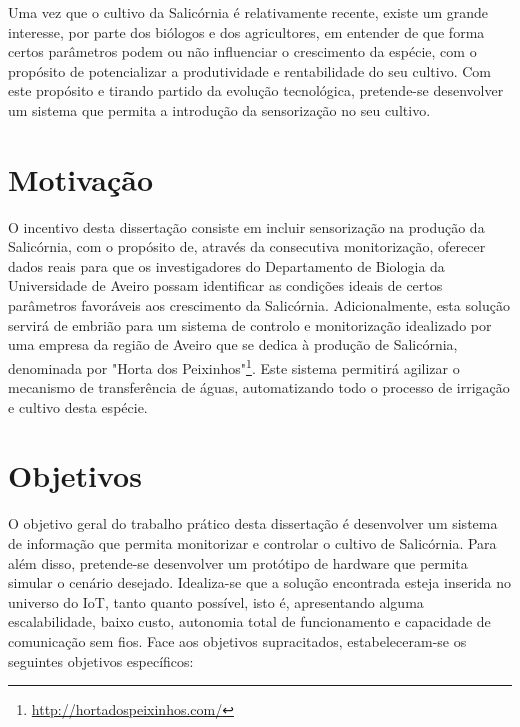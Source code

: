 Uma vez que o cultivo da Salicórnia é relativamente recente, existe um grande interesse, por parte dos biólogos e dos agricultores, em entender de que forma certos parâmetros podem ou não influenciar o crescimento da espécie, com o propósito de potencializar a produtividade e rentabilidade do seu cultivo. Com este propósito e tirando partido da evolução tecnológica, pretende-se desenvolver um sistema que permita a introdução da sensorização no seu cultivo.     


\section{Motivação}

O incentivo desta dissertação consiste em incluir sensorização na produção da Salicórnia, com o propósito de, através da consecutiva monitorização, oferecer dados reais para que os investigadores do Departamento de Biologia da Universidade de Aveiro possam identificar as condições ideais de certos parâmetros favoráveis aos crescimento da Salicórnia. Adicionalmente, esta solução servirá de embrião para um sistema de controlo e monitorização idealizado por uma empresa da região de Aveiro que se dedica à produção de Salicórnia, denominada por "Horta dos Peixinhos"\footnote{\url{http://hortadospeixinhos.com/}}. Este sistema permitirá agilizar o mecanismo de transferência de águas, automatizando todo o processo de irrigação e cultivo desta espécie. 









\section{Objetivos}
\label{objectivos}



O objetivo geral do trabalho prático desta dissertação é desenvolver um sistema de informação que permita monitorizar e controlar o cultivo de Salicórnia. Para além disso, pretende-se desenvolver um protótipo de hardware que permita  simular o cenário desejado. Idealiza-se que a solução encontrada esteja inserida no universo do \ac{IoT}, tanto quanto possível, isto é, apresentando alguma escalabilidade, baixo custo, autonomia total de funcionamento e capacidade de comunicação sem fios. Face aos objetivos supracitados, estabeleceram-se os seguintes objetivos específicos:





